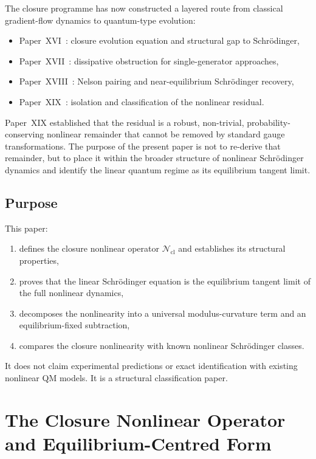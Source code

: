 \documentclass[12pt]{article}
\newcommand{\Ncl}{\mathcal{N}_{\mathrm{cl}}}
\begin{document}
The closure programme has now constructed a layered route from classical gradient-flow dynamics to quantum-type evolution:
\begin{itemize}
    \item Paper~XVI~\citep{SmartXVI}: closure evolution equation and structural gap to Schr\"odinger,
    \item Paper~XVII~\citep{SmartXVII}: dissipative obstruction for single-generator approaches,
    \item Paper~XVIII~\citep{SmartXVIII}: Nelson pairing and near-equilibrium Schr\"odinger recovery,
    \item Paper~XIX~\citep{SmartXIX}: isolation and classification of the nonlinear residual.
\end{itemize}

Paper~XIX established that the residual is a robust, non-trivial, probability-conserving nonlinear remainder that cannot be removed by standard gauge transformations. The purpose of the present paper is not to re-derive that remainder, but to place it within the broader structure of nonlinear Schr\"odinger dynamics and identify the linear quantum regime as its equilibrium tangent limit.

\subsection*{Purpose}

This paper:
\begin{enumerate}
    \item defines the closure nonlinear operator $\Ncl$ and establishes its structural properties,
    \item proves that the linear Schr\"odinger equation is the equilibrium tangent limit of the full nonlinear dynamics,
    \item decomposes the nonlinearity into a universal modulus-curvature term and an equilibrium-fixed subtraction,
    \item compares the closure nonlinearity with known nonlinear Schr\"odinger classes.
\end{enumerate}

It does not claim experimental predictions or exact identification with existing nonlinear QM models. It is a structural classification paper.

\section{The Closure Nonlinear Operator and Equilibrium-Centred Form}\label{sec:operator}
\end{document}
